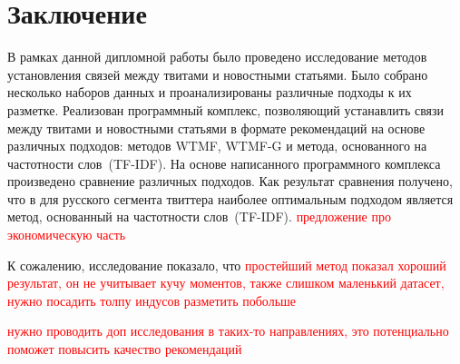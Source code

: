 \section{Заключение}
    В рамках данной дипломной работы было проведено исследование методов установления связей между твитами и новостными статьями.
    Было собрано несколько наборов данных и проанализированы различные подходы к их разметке.
    Реализован программный комплекс, позволяющий устанавлить связи между твитами и новостными статьями в формате рекомендаций на основе различных подходов: методов WTMF, WTMF-G и метода, основанного на частотности слов~(TF-IDF).
    На основе написанного программного комплекса произведено сравнение различных подходов. Как результат сравнения получено, что в для русского сегмента твиттера наиболее оптимальным подходом является метод, основанный на частотности слов~(TF-IDF). \textcolor{red}{предложение про экономическую часть}

    К сожалению, исследование показало, что \textcolor{red}{простейший метод показал хороший результат, он не учитывает кучу моментов, также слишком маленький датасет, нужно посадить толпу индусов разметить побольше}

    \textcolor{red}{нужно проводить доп исследования в таких-то направлениях, это потенциально поможет повысить качество рекомендаций}

    